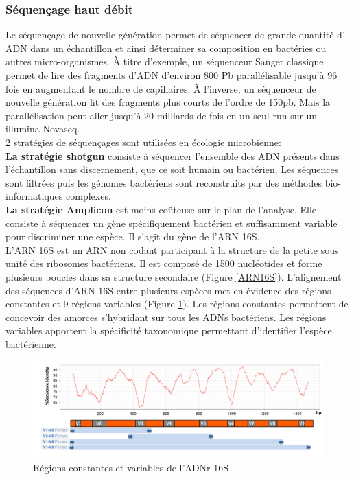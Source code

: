 \documentclass[12pt,a4paper]{article}
\begin{document}
\subsubsection{Séquençage haut débit}
Le séquençage de nouvelle génération permet de séquencer de grande quantité d' ADN dans un échantillon et ainsi déterminer sa composition en bactéries ou autres micro-organismes. À titre d'exemple, un séquenceur Sanger classique permet de lire des fragments d'ADN d'environ 800 Pb parallélisable jusqu'à 96 fois en augmentant le nombre de capillaires. 
À l'inverse, un séquenceur de nouvelle génération lit des fragments plus courts de l'ordre de 150pb. Mais la parallélisation peut aller jusqu'à 20 milliards de fois en un seul run sur un illumina Novaseq. \\
2 stratégies de séquençages sont utilisées en écologie microbienne:  \\
\textbf{La stratégie shotgun} consiste à séquencer l'ensemble des  ADN présents dans l'échantillon sans discernement, que ce soit humain ou bactérien. Les séquences sont filtrées puis les génomes bactériens sont reconstruits par des méthodes bio-informatiques complexes. \\
\textbf{La stratégie Amplicon} est moins coûteuse sur le plan de l'analyse. Elle consiste à séquencer un gène spécifiquement bactérien et suffisamment variable pour discriminer une espèce. Il s'agit du gène de l'ARN 16S.\\
L'ARN 16S est un ARN non codant participant à la structure de la petite sous unité des ribosomes bactériens. Il est composé de 1500 nucléotides et forme plusieurs boucles dans sa structure secondaire (Figure \ref{ARN16S}). 
L'alignement des séquences d'ARN 16S entre plusieurs espèces met en évidence des régions constantes et 9 régions variables (Figure \ref{ARN16SVariation}). Les régions constantes permettent de concevoir des amorces s'hybridant sur tous les ADNs bactériens. Les régions variables apportent la spécificité taxonomique permettant d'identifier l'espèce bactérienne.

\begin{figure}[ht]
\begin{center}
\includegraphics[scale=0.8]{img/ARN16S_variation.png}\hfill
\end{center}
\caption{Régions constantes et variables de l'ADNr 16S}
\label{ARN16SVariation}
\end{figure}
\end{document}
